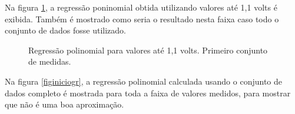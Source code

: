 \documentclass[brazilian,12pt,a4paper,final]{article}
\begin{document}
Na figura \ref{figiniciopeq}, a regressão poninomial obtida utilizando 
valores até 1,1 volts é exibida.
Também é 
mostrado como seria o resultado nesta faixa caso todo o conjunto de dados fosse utilizado.

\begin{figure}[htbp!]
  \caption{Regressão polinomial para valores até 1,1 volts. Primeiro conjunto de medidas.}
  \label{figiniciopeq}
  \centering
\end{figure}

Na figura \ref{figiniciogr}, a regressão polinomial calculada usando o
 conjunto de dados completo é mostrada para toda a faixa de valores medidos, para
mostrar que não é uma boa aproximação.
\end{document}
